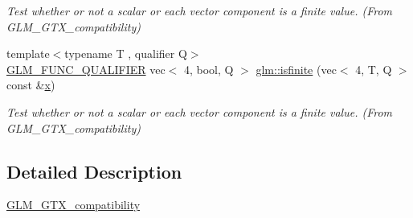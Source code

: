 \begin{DoxyCompactItemize}
\begin{DoxyCompactList}\small\item\em Test whether or not a scalar or each vector component is a finite value. (From G\+L\+M\+\_\+\+G\+T\+X\+\_\+compatibility) \end{DoxyCompactList}\item 
{\footnotesize template$<$typename T , qualifier Q$>$ }\\\hyperlink{setup_8hpp_a33fdea6f91c5f834105f7415e2a64407}{G\+L\+M\+\_\+\+F\+U\+N\+C\+\_\+\+Q\+U\+A\+L\+I\+F\+I\+ER} vec$<$ 4, bool, Q $>$ \hyperlink{group__gtx__compatibility_ga19925badbe10ce61df1d0de00be0b5ad}{glm\+::isfinite} (vec$<$ 4, T, Q $>$ const \&\hyperlink{_s_d_l__opengl_8h_ad0e63d0edcdbd3d79554076bf309fd47}{x})
\begin{DoxyCompactList}\small\item\em Test whether or not a scalar or each vector component is a finite value. (From G\+L\+M\+\_\+\+G\+T\+X\+\_\+compatibility) \end{DoxyCompactList}\end{DoxyCompactItemize}


\subsection{Detailed Description}
\hyperlink{group__gtx__compatibility}{G\+L\+M\+\_\+\+G\+T\+X\+\_\+compatibility} 